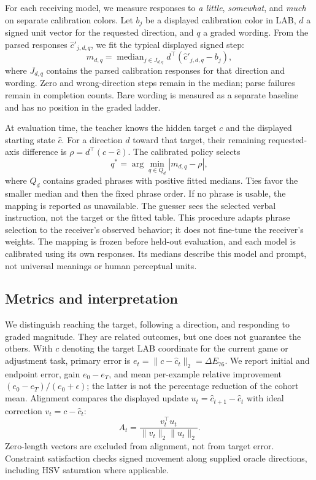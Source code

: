 \documentclass[11pt]{article}
\begin{document}
For each receiving model, we measure responses to \textit{a little},
\textit{somewhat}, and \textit{much} on separate calibration colors.
Let $b_j$ be a displayed calibration color in LAB, $d$ a signed unit vector
for the requested direction, and $q$ a graded wording. From the parsed
responses $\hat c'_{j,d,q}$, we fit the typical displayed signed step:
\begin{equation}
m_{d,q}=\operatorname{median}_{j\in J_{d,q}}
 d^\top(\hat c'_{j,d,q}-b_j),
\end{equation}
where $J_{d,q}$ contains the parsed calibration responses for that
direction and wording. Zero and wrong-direction steps remain in the
median; parse failures remain in completion counts. Bare wording is
measured as a separate baseline and has no position in the graded ladder.

At evaluation time, the teacher knows the hidden target $c$ and the
displayed starting state $\hat c$. For a direction $d$ toward that target,
their remaining requested-axis difference is
$\rho=d^\top(c-\hat c)$. The calibrated policy selects
\begin{equation}
q^*=\arg\min_{q\in Q_d}|m_{d,q}-\rho|,
\end{equation}
where $Q_d$ contains graded phrases with positive fitted medians.
Ties favor the smaller median and then the fixed phrase order.
If no phrase is usable, the mapping is reported as unavailable.
The guesser sees the selected verbal instruction, not the target or
the fitted table. This procedure adapts phrase selection to the receiver's
observed behavior; it does not fine-tune the receiver's weights.
The mapping is frozen before held-out evaluation, and each model is
calibrated using its own responses. Its medians describe this model and
prompt, not universal meanings or human perceptual units.

\subsection{Metrics and interpretation}
\label{sec:metrics}
We distinguish reaching the target, following a direction, and responding
to graded magnitude. They are related outcomes, but one does not guarantee
the others. With $c$ denoting the target LAB coordinate for the current
game or adjustment task, primary error is
$e_t=\|c-\hat c_t\|_2=\Delta E_{76}$.
We report initial and endpoint error, gain $e_0-e_T$, and mean per-example
relative improvement $(e_0-e_T)/(e_0+\epsilon)$; the latter is not the
percentage reduction of the cohort mean. Alignment compares the displayed
update $u_t=\hat c_{t+1}-\hat c_t$ with ideal correction $v_t=c-\hat c_t$:
\begin{equation}
A_t=\frac{v_t^\top u_t}{\|v_t\|_2\|u_t\|_2}.
\end{equation}
Zero-length vectors are excluded from alignment, not from target error.
Constraint satisfaction checks signed movement along supplied oracle
directions, including HSV saturation where applicable.
\end{document}
